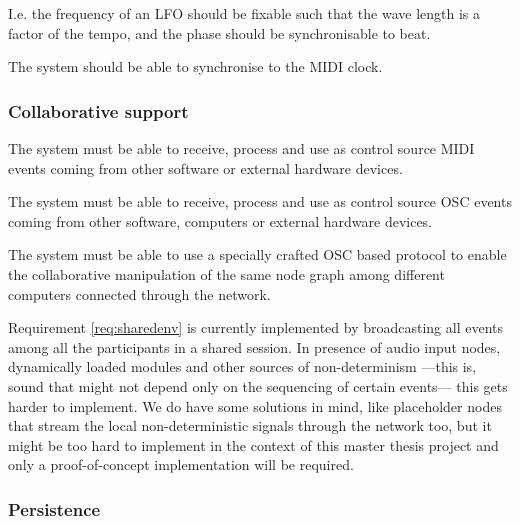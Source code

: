I.e. the frequency of an LFO should be fixable such that the wave
length is a factor of the tempo, and the phase should be
synchronisable to beat.

\begin{requirement}
  The system should be able to synchronise to the MIDI clock.
\end{requirement}

\subsubsection{Collaborative support}

\begin{requirement}
  The system must be able to receive, process and use as control
  source MIDI events coming from other software or external hardware
  devices.
\end{requirement}

\begin{requirement}
  The system must be able to receive, process and use as control
  source OSC events coming from other software, computers or external
  hardware devices.
\end{requirement}

\begin{requirement}
  \label{req:iter4-end}
\label{req:sharedenv}
  The system must be able to use a specially crafted OSC based
  protocol to enable the collaborative manipulation of the same node
  graph among different computers connected through the network.
\end{requirement}

\begin{mynote}
  Requirement \ref{req:sharedenv} is currently implemented by
  broadcasting all events among all the participants in a shared
  session. In presence of audio input nodes, dynamically loaded
  modules and other sources of non-determinism ---this is, sound that
  might not depend only on the sequencing of certain events--- this
  gets harder to implement. We do have some solutions in mind, like
  placeholder nodes that stream the local non-deterministic signals
  through the network too, but it might be too hard to implement in
  the context of this master thesis project and only a
  proof-of-concept implementation will be required.
\end{mynote}


\subsubsection{Persistence}

